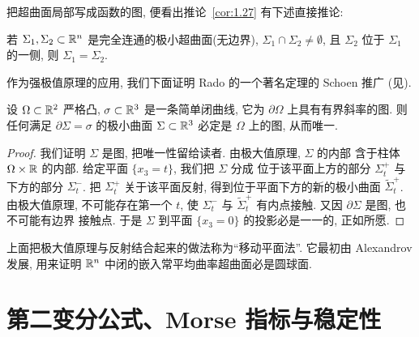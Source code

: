 把超曲面局部写成函数的图, 便看出推论~\ref{cor:1.27} 有下述直接推论:

\begin{corollary}[强极值原理]
\label{cor:1.28}
若 $\Sigma_1,\Sigma_2\subset\mathbb{R}^n$ 是完全连通的极小超曲面(无边界),
$\Sigma_1\cap\Sigma_2\neq\emptyset$, 且 $\Sigma_2$ 位于 $\Sigma_1$ 的一侧,
则 $\Sigma_1=\Sigma_2$.
\end{corollary}

作为强极值原理的应用, 我们下面证明 Rado 的一个著名定理的 Schoen 推广
(见).

\begin{theorem}
\label{thm:1.29}
设 $\Omega\subset\mathbb{R}^2$ 严格凸, $\sigma\subset\mathbb{R}^3$ 是一条简单闭曲线, 它为
$\partial\Omega$ 上具有有界斜率的图. 则任何满足 $\partial\Sigma=\sigma$ 的极小曲面
$\Sigma\subset\mathbb{R}^3$ 必定是 $\Omega$ 上的图, 从而唯一.
\end{theorem}

\begin{proof}
我们证明 $\Sigma$ 是图, 把唯一性留给读者. 由极大值原理, $\Sigma$ 的内部
含于柱体 $\Omega\times\mathbb{R}$ 的内部. 给定平面 $\{x_3=t\}$, 我们把 $\Sigma$ 分成
位于该平面上方的部分 $\Sigma_t^+$ 与下方的部分 $\Sigma_t^-$. 把
$\Sigma_t^+$ 关于该平面反射, 得到位于平面下方的新的极小曲面
$\tilde\Sigma_t^+$. 由极大值原理, 不可能存在第一个 $t$, 使 $\Sigma_t^-$ 与
$\tilde\Sigma_t^+$ 有内点接触. 又因 $\partial\Sigma$ 是图, 也不可能有边界
接触点. 于是 $\Sigma$ 到平面 $\{x_3=0\}$ 的投影必是一一的, 正如所愿.
\end{proof}

上面把极大值原理与反射结合起来的做法称为``移动平面法''. 它最初由 Alexandrov
发展, 用来证明 $\mathbb{R}^n$ 中闭的嵌入常平均曲率超曲面必是圆球面.

\section{第二变分公式、Morse 指标与稳定性}
\label{sec:1.8}

